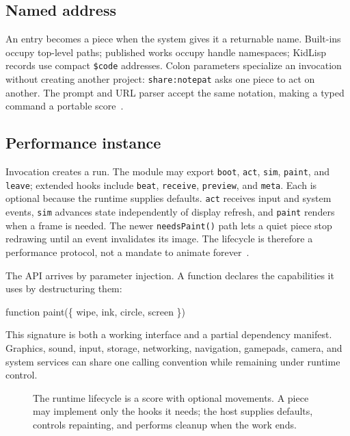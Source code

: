 \documentclass[10pt,letterpaper,twocolumn]{article}
\newcommand{\code}[1]{\texttt{#1}}
\begin{document}
\subsection{Named address}

An entry becomes a piece when the system gives it a returnable name. Built-ins occupy top-level paths; published works occupy handle namespaces; KidLisp records use compact \code{\$code} addresses. Colon parameters specialize an invocation without creating another project: \code{share:notepat} asks one piece to act on another. The prompt and URL parser accept the same notation, making a typed command a portable score~\citep{scudder2026url}.

\subsection{Performance instance}

Invocation creates a run. The module may export \code{boot}, \code{act}, \code{sim}, \code{paint}, and \code{leave}; extended hooks include \code{beat}, \code{receive}, \code{preview}, and \code{meta}. Each is optional because the runtime supplies defaults. \code{act} receives input and system events, \code{sim} advances state independently of display refresh, and \code{paint} renders when a frame is needed. The newer \code{needsPaint()} path lets a quiet piece stop redrawing until an event invalidates its image. The lifecycle is therefore a performance protocol, not a mandate to animate forever~\citep{scudder2026api}.

The API arrives by parameter injection. A function declares the capabilities it uses by destructuring them:

\begin{center}
\small\ttfamily
function paint(\{ wipe, ink, circle, screen \})
\end{center}

This signature is both a working interface and a partial dependency manifest. Graphics, sound, input, storage, networking, navigation, gamepads, camera, and system services can share one calling convention while remaining under runtime control.

\begin{figure}[t]
\centering
\resizebox{\textwidth}{!}{}
\caption{The runtime lifecycle is a score with optional movements. A piece may implement only the hooks it needs; the host supplies defaults, controls repainting, and performs cleanup when the work ends.}
\label{fig:lifecycle}
\end{figure}
\end{document}
